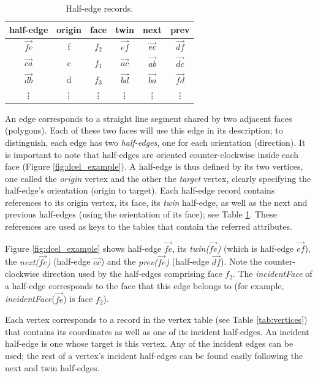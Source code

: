 \begin{table} 
\begin{minipage}{\textwidth}
    \small
    \centering
    \caption{Half-edge records.}\label{tab:hedges}
    \begin{tabular}{c c c c c c} 
        \toprule
        half-edge & origin & face & twin & next & prev \\
        \midrule
        $\vec{fe}$ & f & $f_2$  & $\vec{ef}$ & $\vec{ec}$ & $\vec{df}$ \\
        $\vec{ca}$ & c & $f_1$  & $\vec{ac}$ & $\vec{ab}$ & $\vec{dc}$ \\
        $\vec{db}$ & d & $f_3$  & $\vec{bd}$ & $\vec{ba}$ & $\vec{fd}$ \\
        \vdots     & \vdots & \vdots & \vdots     & \vdots     & \vdots     \\
        \bottomrule
    \end{tabular}
\end{minipage}
\end{table}

An edge corresponds to a straight line segment shared by two adjacent faces (polygons). Each of these two faces will use this edge in its description; to distinguish, each edge has two \textit{half-edges}, one for each orientation (direction). It is important to note that half-edges are oriented counter-clockwise inside each face (Figure \ref{fig:dcel_example}). A half-edge is thus defined by its two vertices, one called the \textit{origin} vertex and the other the \textit{target} vertex, clearly specifying the half-edge's orientation (origin to target). Each half-edge record contains references to its origin vertex, its face, its \textit{twin} half-edge, as well as the next and previous half-edges (using the orientation of its face); see Table \ref{tab:hedges}. These references are used as keys to the tables that contain the referred attributes. 

Figure \ref{fig:dcel_example} shows half-edge $\overrightarrow{fe}$, its \textit{twin($\overrightarrow{fe}$)} (which is half-edge $\overrightarrow{ef}$), the \textit{next($\overrightarrow{fe}$)} (half-edge $\overrightarrow{ec}$) and the \textit{prev($\overrightarrow{fe}$)} (half-edge $\overrightarrow{df}$). Note the counter-clockwise direction used by the half-edges comprising face $f_2$. The \textit{incidentFace} of a half-edge corresponds to the face that this edge belongs to (for example, \textit{incidentFace}($\overrightarrow{fe}$) is face $f_2$).

Each vertex corresponds to a record in the vertex table (see Table \ref{tab:vertices}) that contains its coordinates as well as one of its incident half-edges.  An incident half-edge is one whose target is this vertex. Any of the incident edges can be used; the rest of a vertex's incident half-edges can be found easily following the next and twin half-edges.

